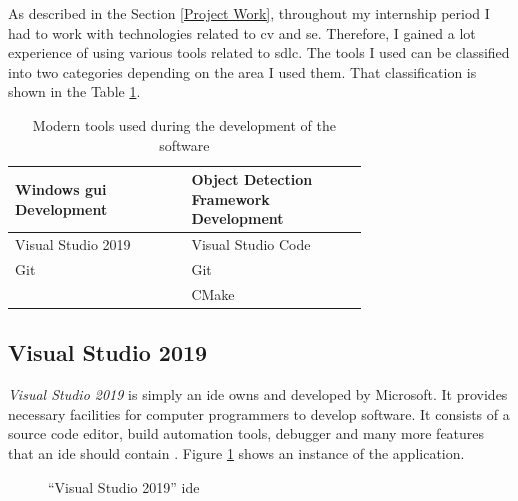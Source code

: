 \documentclass[a4paper,12pt]{report}%
\begin{document}
As described in the Section \ref{Project Work}, throughout my internship period I had to work with technologies related to \ac{cv} and \ac{se}. Therefore, I gained a lot experience of using various tools related to \ac{sdlc}. The tools I used can be classified into two categories depending on the area I used them. That classification is shown in the Table \ref{table:moderntools}.

\begin{table}[H]
	\captionsetup{font=sc, labelsep=newline}
	\centering
	\caption{Modern tools used during the development of the software}
	\begin{tabular}{|p{0.35\linewidth}  |p{0.35\linewidth}  |}
		\hline
		\textbf{Windows \ac{gui} Development} & \textbf{Object Detection Framework Development}\\\hline
		Visual Studio 2019 & Visual Studio Code\\
		Git & Git\\
		& CMake\\		
		\hline
	\end{tabular}
	\label{table:moderntools}
\end{table}

\subsection{Visual Studio 2019}

\textit{Visual Studio 2019} is simply an \ac{ide} owns and developed by Microsoft. It provides necessary facilities for computer programmers to develop software. It consists of a source code editor, build automation tools, debugger and many more features that an \ac{ide} should contain \cite{vs2019}. Figure \ref{fig:vs} shows an instance of the application.\\

\begin{figure}[H]
	\centering
	\caption{``Visual Studio 2019'' \ac{ide}}
	\label{fig:vs}
\end{figure}
\end{document}
